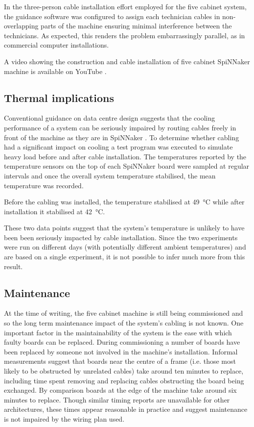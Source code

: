 			In the three-person cable installation effort employed for the five
			cabinet system, the guidance software was configured to assign each
			technician cables in non-overlapping parts of the machine ensuring
			minimal interference between the technicians. As expected, this renders
			the problem embarrassingly parallel, as in commercial computer
			installations.
			
			A video showing the construction and cable installation of five cabinet
			SpiNNaker machine is available on YouTube \cite{heathcote16}.
			
		\subsection{Thermal implications}
			
			Conventional guidance on data centre design suggests that the cooling
			performance of a system can be seriously impaired by routing cables
			freely in front of the machine as they are in SpiNNaker \cite{cisco07}.
			To determine whether cabling had a significant impact on cooling a test
			program was executed to simulate heavy load before and after cable
			installation.  The temperatures reported by the temperature sensors on
			the top of each SpiNNaker board were sampled at regular intervals and
			once the overall system temperature stabilised, the mean temperature was
			recorded.
			
			Before the cabling was installed, the temperature stabilised at
			\SI{49}{\celsius} while after installation it stabilised at
			\SI{42}{\celsius}.
			
			These two data points suggest that the system's temperature is unlikely
			to have been been seriously impacted by cable installation. Since the two
			experiments were run on different days (with potentially different
			ambient temperatures) and are based on a single experiment, it is not
			possible to infer much more from this result.
			
		\subsection{Maintenance}
			
			At the time of writing, the five cabinet machine is still being
			commissioned and so the long term maintenance impact of the system's
			cabling is not known. One important factor in the maintainability of the
			system is the ease with which faulty boards can be replaced. During
			commissioning a number of boards have been replaced by someone not
			involved in the machine's installation. Informal measurements suggest
			that boards near the centre of a frame (i.e. those most likely to be
			obstructed by unrelated cables) take around ten minutes to replace,
			including time spent removing and replacing cables obstructing the board
			being exchanged. By comparison boards at the edge of the machine take
			around six minutes to replace. Though similar timing reports are
			unavailable for other architectures, these times appear reasonable in
			practice and suggest maintenance is not impaired by the wiring plan used.
	
